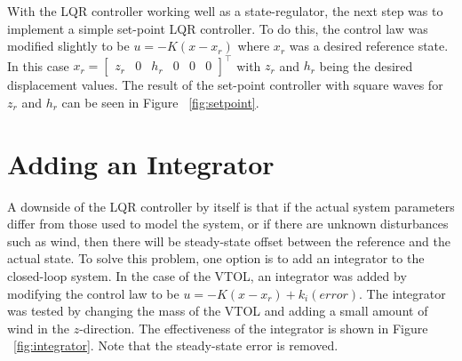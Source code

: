 \documentclass[dvips,12pt]{article}
\begin{document}
With the LQR controller working well as a state-regulator, the next step was to implement a simple set-point LQR controller.  To do this, the control law was modified slightly to be $u = -K(x-x_r)$ where $x_r$ was a desired reference state. In this case $x_r = \begin{bmatrix} z_r & 0 & h_r & 0 & 0 & 0 \end{bmatrix}^\intercal$ with $z_r$ and $h_r$ being the desired displacement values. The result of the set-point controller with square waves for $z_r$ and $h_r$ can be seen in Figure ~\ref{fig:setpoint}.

\section{Adding an Integrator}

A downside of the LQR controller by itself is that if the actual system parameters differ from those used to model the system, or if there are unknown disturbances such as wind, then there will be steady-state offset between the reference and the actual state.  To solve this problem, one option is to add an integrator to the closed-loop system.  In the case of the VTOL, an integrator was added by modifying the control law to be $u = -K(x-x_r) + k_i(error)$.  The integrator was tested by changing the mass of the VTOL and adding a small amount of wind in the $z$-direction.  The effectiveness of the integrator is shown in Figure ~\ref{fig:integrator}. Note that the steady-state error is removed.
\end{document}
